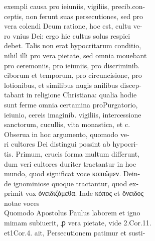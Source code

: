 \documentclass{article}
\begin{document}
\begin{pages}
                exempli causa pro ieiuniis, vigiliis, precib.con- \\
                ceptis, non ferunt suas persecutiones, sed pro \\
                vera colendi Deum ratione, hoc est, cultu ve- \\
                ro vnius Dei: ergo hic cultus solus respici \\
                debet. Talis non erat hypocritarum conditio, \\
                nihil illi pro vera pietate, sed omnia mouebant \\
                pro ceremoniis, pro ieiuniis, pro discriminib. \\
                ciborum et temporum, pro circuncisione, pro \\
                lotionibus, et similibus nugis anilibus discep- \\
                tabant in religione Christiana: qualia hodie \\
                sunt ferme omnia certamina proPurgatorio, \\
                ieiunio, cereis imaginib. vigiliis, intercessione \\
                sanctorum, cucullis, vita monastica, et c. \\
                Obserua in hoc argumento, quomodo ve- \\
                ri cultores Dei distingui possint ab hypocri- \\
                tis. Primum, crucis forma multum differunt, \\
                dum veri cultores duriter tractantur in hoc \\
                mundo, quod significat voce κοπιῶμεν. Dein- \\
                de ignominiose quoque tractantur, quod ex- \\
                primit vox ὀνειδιζόμεθα. Inde κόπος et ὄνειδος \\
                notae voces \\
                Quomodo Apostolus Paulus laborem et igno \\
                mimam subiuerit, ꝓ vera pietate, vide 2.Cor.11. \\
                et1Cor.4. ait, Persecutionem patimur et susti- \\

\end{pages}
\end{document}
